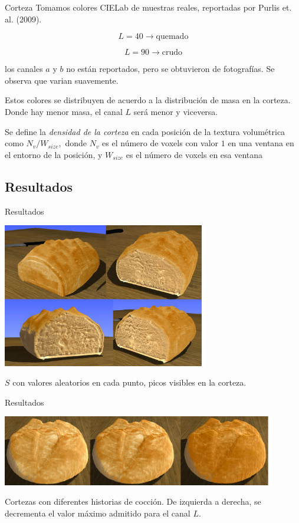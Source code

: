 \documentclass[spanish]{beamer}
\begin{document}
\begin{frame}{Corteza}
Tomamos colores CIELab de muestras reales, reportadas por Purlis et. al. (2009).

$$L = 40 \rightarrow \text{quemado}$$

$$L = 90 \rightarrow \text{crudo}$$

los canales $a$ y $b$ no están reportados, pero se obtuvieron de fotografías. Se observa que varian suavemente.

Estos colores se distribuyen de acuerdo a la distribución de masa en la corteza. Donde hay menor masa, el canal $L$ será menor y viceversa.

Se define la {\em densidad de la corteza} en cada posición de la textura volumétrica como $N_{v} / W_{size},$ donde $N_{v}$ es el número de voxels con valor $1$ en una ventana en el entorno de la posición, y $W_{size}$ es el número de voxels en esa ventana
\end{frame}


\subsection{Resultados}

\begin{frame}{Resultados}

\centerline{\includegraphics[width=9cm]{../figures/Fig11}}

$S$ con valores aleatorios en cada punto, picos visibles en la corteza.

\end{frame}

\begin{frame}{Resultados}

\centerline{\includegraphics[width=12cm]{../figures/Fig13}}
Cortezas con diferentes historias de cocción. De izquierda a derecha, se decrementa el valor máximo admitido para el canal $L$.

\end{frame}
\end{document}
